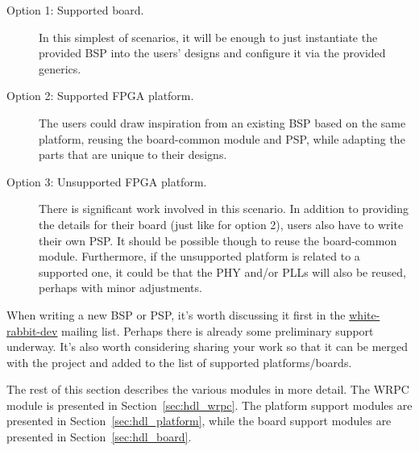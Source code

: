 \begin{description}
  \item[Option 1: Supported board.] In this simplest of scenarios, it will be enough to just
    instantiate the provided BSP into the users' designs and configure it via the provided generics.
  \item[Option 2: Supported FPGA platform.] The users could draw inspiration from an existing BSP
    based on the same platform, reusing the board-common module and PSP, while adapting the parts
    that are unique to their designs.
  \item[Option 3: Unsupported FPGA platform.] There is significant work involved in this
    scenario. In addition to providing the details for their board (just like for option 2), users
    also have to write their own PSP. It should be possible though to reuse the board-common
    module. Furthermore, if the unsupported platform is related to a supported one, it could be that
    the PHY and/or PLLs will also be reused, perhaps with minor adjustments.
\end{description}

When writing a new BSP or PSP, it's worth discussing it first in the
\href{http://www.ohwr.org/mailing_list/show?project_id=white-rabbit}{white-rabbit-dev} mailing
list. Perhaps there is already some preliminary support underway. It's also worth considering
sharing your work so that it can be merged with the project and added to the list of supported
platforms/boards.

The rest of this section describes the various modules in more detail. The WRPC module is presented
in Section~\ref{sec:hdl_wrpc}. The platform support modules are presented in
Section~\ref{sec:hdl_platform}, while the board support modules are presented in
Section~\ref{sec:hdl_board}.

